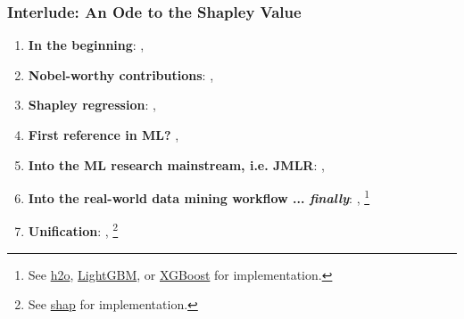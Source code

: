 \documentclass[11pt,aspectratio=169,hyperref={colorlinks}]{beamer}
\begin{document}
	\begin{frame}
		
		\frametitle{\textbf{Interlude}: An Ode to the Shapley Value}		
		
		\begin{enumerate}\footnotesize
				
			\item \textbf{In the beginning}: ,  \cite{shapley1953value}
			\item \textbf{Nobel-worthy contributions}: ,  \cite{shapley1988shapley}
			\item \textbf{Shapley regression}: ,  \cite{lipovetsky2001analysis}
			\item \textbf{First reference in ML?} ,  \cite{keinan2004fair}
			\item \textbf{Into the ML research mainstream, i.e. JMLR}: ,  \cite{kononenko2010efficient}
			\item \textbf{Into the real-world data mining workflow ... \textit{finally}}: , \footnote{\tiny{See \href{https://github.com/h2oai/h2o-3}{h2o}, \href{https://github.com/microsoft/LightGBM}{LightGBM}, or \href{https://github.com/dmlc/xgboost}{XGBoost} for implementation.}} \cite{tree_shap} 
			\item \textbf{Unification}: , \footnote{\tiny{See \href{https://github.com/slundberg/shap}{shap} for implementation.}} \cite{shapley}
				
		\end{enumerate}
			
	\end{frame}
	
\end{document}

